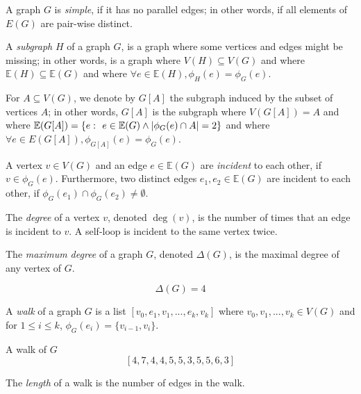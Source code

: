 \documentclass{article}
\begin{document}
	A graph $G$ is \textit{simple}, if it has no parallel edges; in other words, if all elements of $E(G)$ are pair-wise distinct.

	\begin{center}
		
	\end{center}

	A \textit{subgraph} $H$ of a graph $G$, is a graph where some vertices and edges might be missing; in other words, is a graph where $V(H) \subseteq V(G)$ and where $\mathbb{E}(H) \subseteq \mathbb{E}(G)$ and where $\forall e \in \mathbb{E}(H), \phi_H(e) = \phi_G(e)$.

	\begin{center}
		
	\end{center}

	For $A \subseteq V(G)$, we denote by $G[A]$ the subgraph induced by the subset of vertices $A$; in other words, $G[A]$ is the subgraph where $V(G[A]) = A$ and where $\mathbb{E}(G[A]) = \{ e \,\colon\  e \in \mathbb{E}(G) \land |\phi_G(e) \cap A| = 2\}$ and where $\forall e \in E(G[A]), \phi_{G[A]}(e) = \phi_{G}(e)$.

	\begin{center}
		
	\end{center}

	A vertex $v \in V(G)$ and an edge $e \in \mathbb{E}(G)$ are \textit{incident} to each other, if $v \in \phi_G(e)$. Furthermore, two distinct edges $e_1,e_2 \in \mathbb{E}(G)$ are incident to each other, if $\phi_G(e_1) \cap \phi_G(e_2) \neq \emptyset$.

	The \textit{degree} of a vertex $v$, denoted $\deg(v)$, is the number of times that an edge is incident to $v$. A self-loop is incident to the same vertex twice.

	\begin{center}
		
	\end{center}

	The \textit{maximum degree} of a graph $G$, denoted $\Delta(G)$, is the maximal degree of any vertex of $G$.

	$$\Delta(G) = 4$$

	A \textit{walk} of a graph $G$ is a list $[v_0,e_1,v_1,...,e_k,v_k]$ where $v_0,v_1,...,v_k \in V(G)$ and for $1 \leq i \leq k$, $\phi_{G}(e_i) = \{v_{i-1}, v_i\}$.

	A walk of $G$ $$[4,7,4,4,5,5,3,5,5,6,3]$$

	The \textit{length} of a walk is the number of edges in the walk.
	
\end{document}
